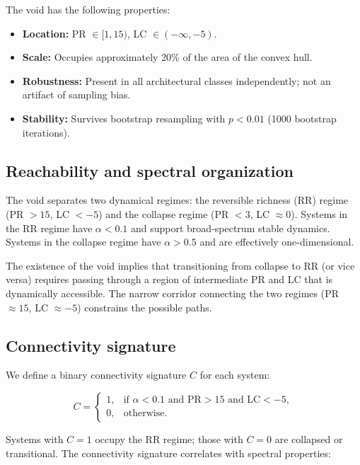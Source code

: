 \documentclass{chaos-article}
\begin{document}
The void has the following properties:
\begin{itemize}
\item \textbf{Location:} PR $\in [1, 15)$, LC $\in (-\infty, -5)$.
\item \textbf{Scale:} Occupies approximately 20\% of the area of the convex hull.
\item \textbf{Robustness:} Present in all architectural classes independently; not an artifact of sampling bias.
\item \textbf{Stability:} Survives bootstrap resampling with $p < 0.01$ (1000 bootstrap iterations).
\end{itemize}

\subsection{Reachability and spectral organization}

The void separates two dynamical regimes: the reversible richness (RR) regime (PR $> 15$, LC $< -5$) and the collapse regime (PR $< 3$, LC $\approx 0$). Systems in the RR regime have $\alpha < 0.1$ and support broad-spectrum stable dynamics. Systems in the collapse regime have $\alpha > 0.5$ and are effectively one-dimensional.

The existence of the void implies that transitioning from collapse to RR (or vice versa) requires passing through a region of intermediate PR and LC that is dynamically accessible. The narrow corridor connecting the two regimes (PR $\approx 15$, LC $\approx -5$) constrains the possible paths.

\subsection{Connectivity signature}

We define a binary connectivity signature $C$ for each system:

\begin{equation}
C = \begin{cases}
1, & \text{if } \alpha < 0.1 \text{ and PR} > 15 \text{ and LC} < -5,\\
0, & \text{otherwise.}
\end{cases}
\end{equation}

Systems with $C = 1$ occupy the RR regime; those with $C = 0$ are collapsed or transitional. The connectivity signature correlates with spectral properties:
\end{document}
